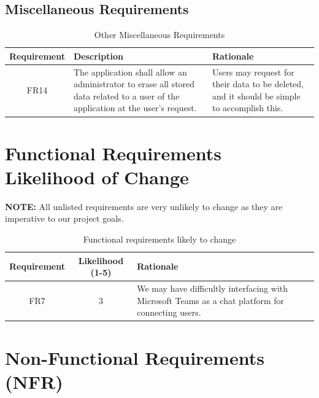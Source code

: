 \documentclass[fullpage]{article}
\begin{document}
\newpage
\subsection{Miscellaneous Requirements}
\begin{table}[h!]
\flushleft
\begin{tabular}{|c|p{6cm}|p{6cm}|}
\hline
 \rowcolor{lightgray} 
\textbf{Requirement} & \textbf{Description} & \textbf{Rationale} \\
\hline
FR14& The application shall allow an administrator to erase all stored data related to a user of the application at the user's request. & Users may request for their data to be deleted, and it should be simple to accomplish this.\\
\hline

\end{tabular}
\caption{Other Miscellaneous Requirements}
\end{table}

\section{Functional Requirements Likelihood of Change}

\textbf{NOTE:} All unlisted requirements are very unlikely to change as they are imperative to our project goals.
\begin{table}[h!]
\flushleft
\begin{tabular}{|c|c|p{6cm}|}
\hline
 \rowcolor{lightgray} 
\textbf{Requirement} & \textbf{Likelihood (1-5)} & \textbf{Rationale} \\
\hline
FR7 & 3 & We may have difficultly interfacing with Microsoft Teams as a chat platform for connecting users. \\
\hline
\end{tabular}
\caption{Functional requirements likely to change}
\end{table}


\section{Non-Functional Requirements (NFR)}
\end{document}
